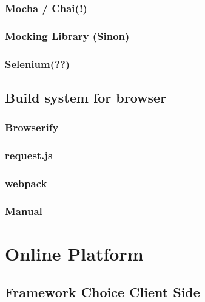 		\subsubsection{Mocha / Chai(!)}
		\label{sssect:mocha_chai}
		
		\subsubsection{Mocking Library (Sinon)}
		\label{sssect:mocking}

		\subsubsection{Selenium(??)}
		\label{sssect:selenium}

	\subsection{Build system for browser}
		\label{ssect:build_browser}
		
		\subsubsection{Browserify}
		\label{sssect:browserify}
		
		\subsubsection{request.js}
		\label{sssect:request_js}
		
		\subsubsection{webpack}
		\label{sssect:webpack}
		
		\subsubsection{Manual}
		\label{sssect:manual}



\section{Online Platform}
\label{sect:sw_db}

	\subsection{Framework Choice Client Side}
	\label{ssect:sw_framework_client_side}
	
